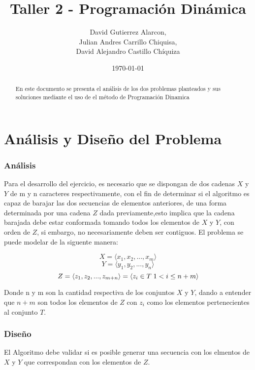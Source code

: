\documentclass[]{article}
\numberwithin{equation}{section}
\numberwithin{figure}{section}
\theoremstyle{definition}
\begin{document}
\title{Taller 2 - Programación Dinámica}
\author{%
David Gutierrez Alarcon,\\ Julian Andres Carrillo Chiquisa,\\ David Alejandro Castillo Chíquiza}
\date{%
\today}
\maketitle

\begin{abstract}
En este documento se presenta el análisis de los dos problemas planteados y sus soluciones mediante el uso de el método de Programación Dinamica
\end{abstract}

\part*{Análisis y Diseño del Problema}

\section*{Análisis}

\text Para el desarrollo del ejercicio, es necesario que se dispongan de dos cadenas $X$ y $Y$ de m y n caracteres respectivamente, con el fin de determinar si el algoritmo es capaz de barajar las dos  secuencias de elementos anteriores, de una forma determinada por una cadena $Z$ dada previamente,esto implica que la cadena barajada debe estar conformada tomando todos los elementos de $X$ y $Y$, con orden de $Z$, si embargo, no necesariamente deben ser contiguos. El problema se puede modelar de la siguente manera: 

$$X=\langle x_1,x_2,...,x_m \rangle$$
$$Y=\langle y_1,y_2,...,y_n \rangle$$
$$Z=\langle z_1,z_2,...,z_{m+n} \rangle = \langle z_i \in T \hspace{1mm} 1<i \leq n+m \rangle$$

\text Donde n y m son la cantidad respectiva de los conjuntos $X$ y $Y$, dando a entender que $n+m$ son todos los elementos de $Z$ con $z_i$ como los elementos pertenecientes al conjunto $T$.


\section*{Diseño}

\text El Algoritmo debe validar si es posible generar una secuencia con los elmentos de $X$ y $Y$ que correspondan con los elementos de $Z$.
\end{document}
